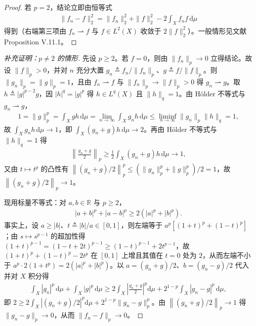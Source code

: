 \documentclass[../../main.tex]{subfiles}%
\begin{document}
\begin{proof}
若 $p=2$，结论立即由恒等式
\begin{align*}
\|f_n-f\|_2^2=\|f_n\|_2^2+\|f\|_2^2-2\int_X f_nf\,\mathrm{d}\mu
\end{align*}
得到（右端第三项由 $f_n\rightharpoonup f$ 与 $f\in L^2(X)$ 收敛于 $2\|f\|_2^2$）。一般情形见文献\cite{ref40} Proposition V.11.1。
\end{proof}

\begin{proof}[补充证明：$p\neq2$ 的情形]
先设 $p\geqslant2$。若 $f=0$，则由 $\|f_n\|_p\to0$ 立得结论。故设 $\|f\|_p>0$，并对 $n$ 充分大置 $g_n\triangleq f_n/\|f_n\|_p$、$g\triangleq f/\|f\|_p$。则 $\|g_n\|_p=\|g\|_p=1$，且由 $f_n\rightharpoonup f$ 与 $\|f_n\|_p\to\|f\|_p>0$ 得 $g_n\rightharpoonup g$。取 $h\triangleq|g|^{p-2}g$，因 $|h|^q=|g|^p$ 得 $h\in L^q(X)$ 且 $\|h\|_q=1$。由 Hölder 不等式与 $g_n\rightharpoonup g$，
\begin{align*}
1=\|g\|_p^p=\int_Xgh\,\mathrm{d}\mu=\lim_{n\to\infty}\int_Xg_nh\,\mathrm{d}\mu\leqslant\liminf_{n\to\infty}\|g_n\|_p\|h\|_q=1,
\end{align*}
故 $\int_Xg_nh\,\mathrm{d}\mu\to1$，即 $\int_X(g_n+g)h\,\mathrm{d}\mu\to2$。再由 Hölder 不等式与 $\|h\|_q=1$ 得
\begin{align*}
\left\|\frac{g_n+g}{2}\right\|_p\geqslant\frac12\int_X(g_n+g)h\,\mathrm{d}\mu\to1,
\end{align*}
又由 $t\mapsto t^p$ 的凸性有 $\left\|(g_n+g)/2\right\|_p^p\leqslant(\|g_n\|_p^p+\|g\|_p^p)/2=1$，故 $\left\|(g_n+g)/2\right\|_p\to1$。

现用标量不等式：对 $a,b\in\mathbb R$ 与 $p\geqslant2$，
\begin{align*}
|a+b|^p+|a-b|^p\geqslant2(|a|^p+|b|^p).
\end{align*}
事实上，设 $a\geqslant|b|$、$t\triangleq|b|/a\in[0,1]$，则左端等于 $a^p[(1+t)^p+(1-t)^p]$；由 $s\mapsto s^{p-1}$ 的超加性得 $(1+t)^{p-1}=(1-t+2t)^{p-1}\geqslant(1-t)^{p-1}+2t^{p-1}$，故 $(1+t)^p+(1-t)^p-2t^p$ 在 $[0,1]$ 上增且其值在 $t=0$ 处为 $2$，从而左端不小于 $a^p\cdot2(1+t^p)=2(|a|^p+|b|^p)$。以 $a=(g_n+g)/2$、$b=(g_n-g)/2$ 代入并对 $X$ 积分得
\begin{align*}
\int_X|g_n|^p\,\mathrm{d}\mu+\int_X|g|^p\,\mathrm{d}\mu\geqslant2\int_X\left|\frac{g_n+g}{2}\right|^p\mathrm{d}\mu+2^{1-p}\int_X|g_n-g|^p\,\mathrm{d}\mu,
\end{align*}
即 $2\geqslant2\int_X\left|(g_n+g)/2\right|^p\mathrm{d}\mu+2^{1-p}\|g_n-g\|_p^p$。由 $\left\|(g_n+g)/2\right\|_p\to1$ 得 $\|g_n-g\|_p\to0$，从而 $\|f_n-f\|_p\to0$。


\end{proof}
\end{document}
